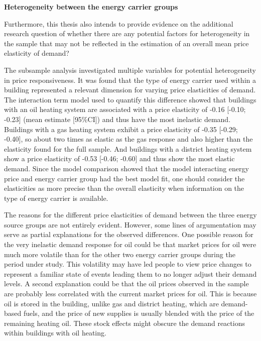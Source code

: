 \documentclass[12pt,twoside]{reedthesis}
\begin{document}
\textbf{Heterogeneity between the energy carrier groups}

Furthermore, this thesis also intends to provide evidence on the additional research question of whether there are any potential factors for heterogeneity in the sample that may not be reflected in the estimation of an overall mean price elasticity of demand?

The subsample analysis investigated multiple variables for potential heterogeneity in price responsiveness. It was found that the type of energy carrier used within a building represented a relevant dimension for varying price elasticities of demand. The interaction term model used to quantify this difference showed that buildings with an oil heating system are associated with a price elasticity of -0.16 {[}-0.10; -0.23{]} (mean estimate {[}95\%CI{]}) and thus have the most inelastic demand. Buildings with a gas heating system exhibit a price elasticity of -0.35 {[}-0.29; -0.40{]}, so about two times as elastic as the gas response and also higher than the elasticity found for the full sample. And buildings with a district heating system show a price elasticity of -0.53 {[}-0.46; -0.60{]} and thus show the most elastic demand. Since the model comparison showed that the model interacting energy price and energy carrier group had the best model fit, one should consider the elasticities as more precise than the overall elasticity when information on the type of energy carrier is available.

The reasons for the different price elasticities of demand between the three energy source groups are not entirely evident. However, some lines of argumentation may serve as partial explanations for the observed differences. One possible reason for the very inelastic demand response for oil could be that market prices for oil were much more volatile than for the other two energy carrier groups during the period under study. This volatility may have led people to view price changes to represent a familiar state of events leading them to no longer adjust their demand levels. A second explanation could be that the oil prices observed in the sample are probably less correlated with the current market prices for oil. This is because oil is stored in the building, unlike gas and district heating, which are demand-based fuels, and the price of new supplies is usually blended with the price of the remaining heating oil. These stock effects might obscure the demand reactions within buildings with oil heating.
\end{document}
